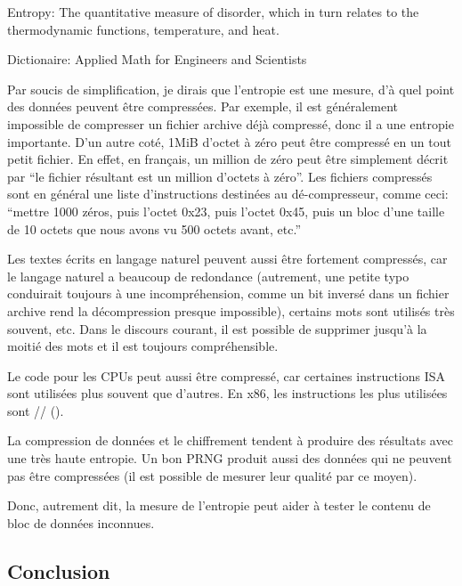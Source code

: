 \label{entropy}

\epigraph{Entropy: The quantitative measure of disorder, which in turn relates to the thermodynamic functions, temperature, and heat.}
{Dictionaire:  Applied Math for Engineers and Scientists}

Par soucis de simplification, je dirais que l'entropie est une mesure, d'à quel
point des données peuvent être compressées.
Par exemple, il est généralement impossible de compresser un fichier archive
déjà compressé, donc il a une entropie importante.
D'un autre coté, 1MiB d'octet à zéro peut être compressé en un tout petit fichier.
En effet, en français, un million de zéro peut être simplement décrit par
``le fichier résultant est un million d'octets à zéro''.
Les fichiers compressés sont en général une liste d'instructions destinées au dé-compresseur,
comme ceci:
``mettre 1000 zéros, puis l'octet 0x23, puis l'octet 0x45, puis un bloc d'une
taille de 10 octets que nous avons vu 500 octets avant, etc.''

Les textes écrits en langage naturel peuvent aussi être fortement compressés, car
le langage naturel a beaucoup de redondance (autrement, une petite typo conduirait
toujours à une incompréhension, comme un bit inversé dans un fichier archive rend
la décompression presque impossible), certains mots sont utilisés très souvent, etc.
Dans le discours courant, il est possible de supprimer jusqu'à la moitié
des mots et il est toujours compréhensible.

Le code pour les CPUs peut aussi être compressé, car certaines instructions \ac{ISA}
sont utilisées plus souvent que d'autres.
En x86, les instructions les plus utilisées sont //
().

La compression de données et le chiffrement tendent à produire des résultats avec
une très haute entropie.
Un bon \ac{PRNG} produit aussi des données qui ne peuvent pas être compressées
(il est possible de mesurer leur qualité par ce moyen).

Donc, autrement dit, la mesure de l'entropie peut aider à tester le contenu de bloc
de données inconnues.



\subsection{Conclusion}

